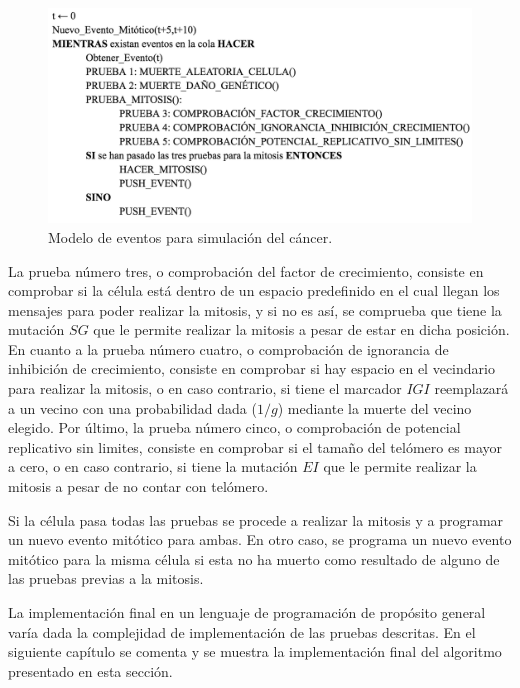 \begin{figure}[h]
\centering
\includegraphics[scale=0.8]{figures/pseudo_alg}
\caption{Modelo de eventos para simulación del cáncer.}
\label{fig:eventmodel}
\end{figure}

La prueba número tres, o comprobación del factor de crecimiento, consiste en comprobar
si la célula está dentro de un espacio predefinido en el cual llegan los mensajes
para poder realizar la mitosis, y si no es así, se comprueba que tiene la mutación $SG$
que le permite realizar la mitosis a pesar de estar en dicha posición. En cuanto a la prueba
número cuatro, o comprobación de ignorancia de inhibición de crecimiento, consiste en comprobar
si hay espacio en el vecindario para realizar la mitosis, o en caso contrario, si tiene el marcador
$IGI$ reemplazará a un vecino con una probabilidad dada ($1/g$) mediante la muerte del vecino elegido.
Por último, la prueba número cinco, o comprobación de potencial replicativo sin limites,
consiste en comprobar si el tamaño del telómero es mayor a cero, o en caso contrario,
si tiene la mutación $EI$ que le permite realizar la mitosis a pesar de no contar con telómero.

Si la célula pasa todas las pruebas se procede a realizar la mitosis y a programar un nuevo evento mitótico para ambas.
En otro caso, se programa un nuevo evento mitótico para la misma célula si esta no ha muerto como
resultado de alguno de las pruebas previas a la mitosis.

La implementación final en un lenguaje de programación de propósito general varía dada
la complejidad de implementación de las pruebas descritas. En el siguiente capítulo se comenta y se muestra
la implementación final del algoritmo presentado en esta sección.
